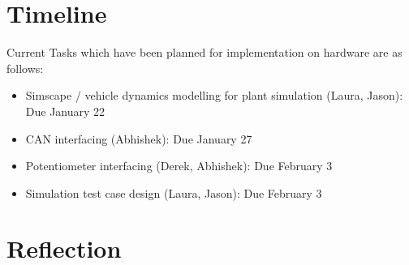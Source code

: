 \documentclass[12pt, titlepage]{article}
\begin{document}
\section{Timeline}

Current Tasks which have been planned for implementation on hardware are as follows:
\begin{itemize}
    \item Simscape / vehicle dynamics modelling for plant simulation (Laura, Jason): Due January 22
    \item CAN interfacing (Abhishek): Due January 27
    \item Potentiometer interfacing (Derek, Abhishek): Due February 3
    \item Simulation test case design (Laura, Jason): Due February 3
\end{itemize}

\newpage{}

\appendix






\section{Reflection}


  
\end{document}

